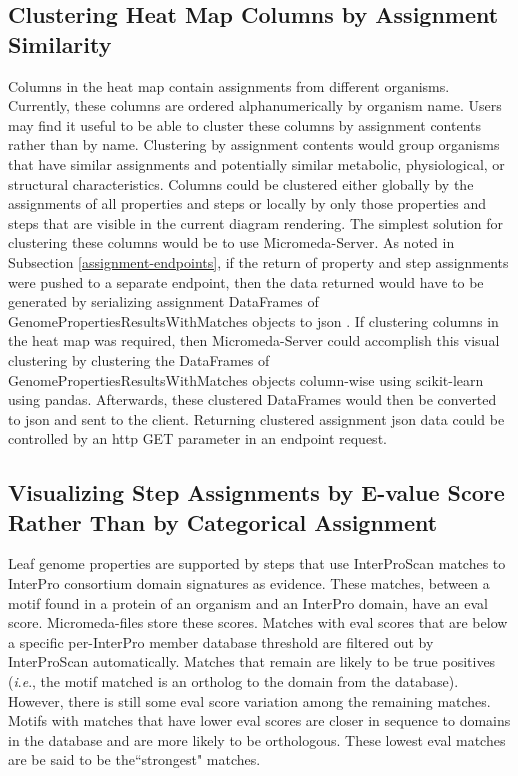 \subsection{Clustering Heat Map Columns by Assignment Similarity}

Columns in the heat map contain assignments from different organisms. Currently, 
these columns are ordered alphanumerically by organism name. Users may find it 
useful to be able to cluster these columns by assignment contents rather than by 
name. Clustering by assignment contents would group organisms that have similar 
assignments and potentially similar metabolic, physiological, or structural 
characteristics. Columns could be clustered either globally by the assignments 
of all properties and steps or locally by only those properties and steps that 
are visible in the current diagram rendering. The simplest solution for 
clustering these columns would be to use Micromeda-Server. As noted in 
Subsection \ref{assignment-endpoints}, if the return of property and step 
assignments were pushed to a separate endpoint, then the data returned would 
have to be generated by serializing assignment DataFrames of 
GenomePropertiesResultsWithMatches objects to \gls{json} \cite{bray2014rfc}. If 
clustering columns in the heat map was required, then Micromeda-Server could 
accomplish this visual clustering by clustering the DataFrames of 
GenomePropertiesResultsWithMatches objects column-wise using \gls{scikit}-learn 
\cite{pedregosa2011scikit} using pandas. Afterwards, these clustered DataFrames 
would then be converted to \gls{json} and sent to the client. Returning 
clustered assignment \gls{json} data could be controlled by an \gls{http} GET 
parameter in an endpoint request.

\subsection{Visualizing Step Assignments by E-value Score Rather Than by 
Categorical Assignment} \label{interface-e-value}

Leaf genome properties are supported by steps that use InterProScan matches to 
InterPro consortium domain signatures as evidence. These matches, between a 
motif found in a protein of an organism and an InterPro domain, have an 
\gls{eval} score. Micromeda-files store these scores. Matches with \gls{eval} 
scores that are below a specific per-InterPro member database threshold are 
filtered out by InterProScan automatically. Matches that remain are likely to be 
true positives (\textit{i}.\textit{e}., the motif matched is an ortholog to the domain from the 
database). However, there is still some \gls{eval} score variation among the 
remaining matches. Motifs with matches that have lower \gls{eval} scores are 
closer in sequence to domains in the database and are more likely to be 
orthologous. These lowest \gls{eval} matches are be said to be the``strongest" 
matches.

